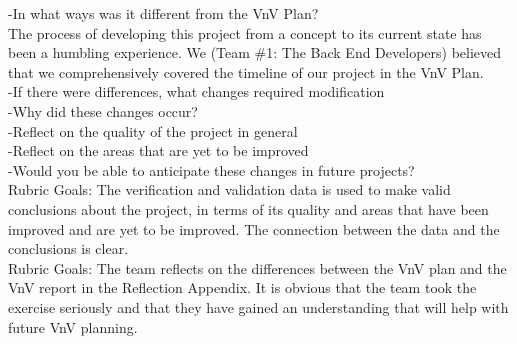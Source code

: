 \documentclass[12pt, titlepage]{article}
\begin{document}
-In what ways was it different from the VnV Plan?\\

The process of developing this project from a concept to its current state has been a humbling experience. We (Team \#1: The Back End Developers) believed that we comprehensively covered the timeline of our project in the VnV Plan. \\

-If there were differences, what changes required modification\\
-Why did these changes occur?\\
-Reflect on the quality of the project in general\\
-Reflect on the areas that are yet to be improved\\
-Would you be able to anticipate these changes in future projects?\\

Rubric Goals: The verification and validation data is used to make valid conclusions about the project, in terms of its quality and areas that have been improved and are yet to be improved.  The connection between the data and the conclusions is clear.\\
Rubric Goals: The team reflects on the differences between the VnV plan and the VnV report in the Reflection Appendix.  It is obvious that the team took the exercise seriously and that they have gained an understanding that will help with future VnV planning.\\
\end{document}
